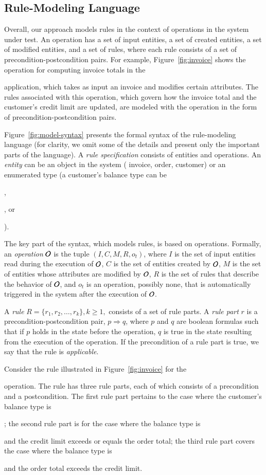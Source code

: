 \subsection{Rule-Modeling Language}

Overall, our approach models rules in the context of operations in the system
under test.  An operation has a set of input entities, a set of created
entities, a set of modified entities, and a set of rules, where each rule
consists of a set of precondition-postcondition pairs. For example,
Figure~\ref{fig:invoice} shows the operation for computing invoice totals in the
\subject{JBilling} application, which takes as input an invoice and modifies
certain attributes. The rules associated with this operation, which govern how
the invoice total and the customer's credit limit are updated, are modeled with
the operation in the form of precondition-postcondition pairs.

Figure~\ref{fig:model-syntax} presents the formal syntax of the rule-modeling
language (for clarity, we omit some of the details and present only the
important parts of the language). A \textit{rule specification} consists of
entities and operations. An \textit{entity} can be an object in the system (\eg
invoice, order, customer) or an enumerated type (\eg a customer's balance type
can be \subject{None}, \subject{Credit}, or \subject{Prepaid}).

The key part of the syntax, which models rules, is based on
operations. Formally, an \textit{operation} ${\cal O}$ is the tuple $(I, C, M,
R, o_t)$, where $I$ is the set of input entities read during the execution of
${\cal O}$, $C$ is the set of entities created by ${\cal O}$, $M$ is the set of
entities whose attributes are modified by ${\cal O}$, $R$ is the set of rules
that describe the behavior of ${\cal O}$, and $o_t$ is an operation, possibly
none, that is automatically triggered in the system after the execution of
${\cal O}$.

A \textit{rule} $R = \{r_1, r_2, \ldots, r_k\}, k \geq 1,$ consists of a set of
rule parts. A \textit{rule part} $r$ is a precondition-postcondition pair, $p
\Longrightarrow q$, where $p$ and $q$ are boolean formulas such that if $p$
holds in the state before the operation, $q$ is true in the state resulting from
the execution of the operation. If the precondition of a rule part is true, we
say that the rule is \textit{applicable}.

Consider the rule illustrated in Figure~\ref{fig:invoice} for the
\subject{Compute Invoice Total} operation. The rule has three rule parts, each
of which consists of a precondition and a postcondition. The first rule part
pertains to the case where the customer's balance type is \subject{None}; the
second rule part is for the case where the balance type is \subject{Credit} and
the credit limit exceeds or equals the order total; the third rule part covers
the case where the balance type is \subject{Credit} and the order total exceeds
the credit limit.


